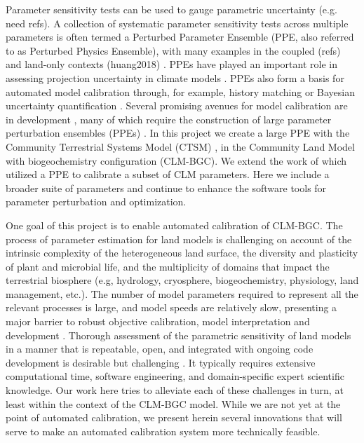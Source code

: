 \documentclass[draft]{agujournal2019}
\begin{document}
Parameter sensitivity tests can be used to gauge parametric uncertainty (e.g. need refs).
A collection of systematic parameter sensitivity tests across multiple parameters is often termed a Perturbed Parameter Ensemble (PPE, also referred to as Perturbed Physics Ensemble), with many examples in the coupled (refs) and land-only contexts (huang2018) \cite{dagon2020}. 
PPEs have played an important role in assessing projection uncertainty in climate models \cite{murphy2004,sanderson2008,booth2012,hawkins2019,yamazaki2021,peatier2022,tett2022}.
PPEs also form a basis for automated model calibration through, for example, history matching \cite{williamson2013,williamson2017,hourdin2020,couvreux2021} or Bayesian uncertainty quantification \cite{cleary2021}.
Several promising avenues for model calibration are in development \cite{pinnington2020,cleary2021,alonso-gonzalez2022}, many of which require the construction of large parameter perturbation ensembles (PPEs) \cite{qian2018}.  
In this project we create a large PPE with the Community Terrestrial Systems Model (CTSM) \cite{lawrence2019}, in the Community Land Model with biogeochemistry configuration (CLM-BGC). We extend the work of  which utilized a PPE to calibrate a subset of CLM parameters. Here we include a broader suite of parameters and continue to enhance the software tools for parameter perturbation and optimization.

One goal of this project is to enable automated calibration of CLM-BGC.
The process of parameter estimation for land models is challenging on account of the intrinsic complexity of the heterogeneous land surface, the diversity and plasticity of plant and microbial life, and the multiplicity of domains that impact the terrestrial biosphere (e.g, hydrology, cryosphere, biogeochemistry, physiology, land management, etc.). The number of model parameters required to represent all the relevant processes is large, and model speeds are relatively slow, presenting a major barrier to robust objective calibration, model interpretation and development \cite{fisher2020,dagon2020}.
Thorough assessment of the parametric sensitivity of land models in a manner that is repeatable, open, and integrated with ongoing code development is desirable but challenging \cite{hourdin2017,balaji2022}. It typically requires extensive computational time,  software engineering, and domain-specific expert scientific knowledge.
Our work here tries to alleviate each of these challenges in turn, at least within the context of the CLM-BGC model.
While we are not yet at the point of automated calibration, we present herein several innovations that will serve to make an automated calibration system more technically feasible.
\end{document}
